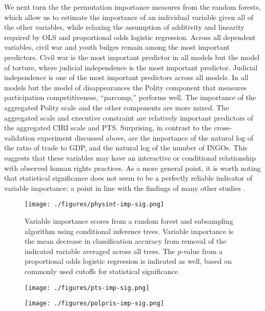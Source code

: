 \documentclass[12pt]{article}
\begin{document}
We next turn the the permutation importance measures from the random forests, which allow us to estimate the importance of an individual variable given all of the other variables, while relaxing the assumption of additivity and linearity required by OLS and proportional odds logistic regression. Across all dependent variables, civil war and youth bulges remain among the most important predictors. Civil war is the most important predictor in all models but the model of torture, where judicial independence is the most important predictor. Judicial independence is one of the most important predictors across all models. In all models but the model of disappearances the Polity component that measures participation competitiveness, ``parcomp,'' performs well. The importance of the aggregated Polity scale and the other components are more mixed. The aggregated scale and executive constraint are relatively important predictors of the aggregated CIRI scale and PTS. Surprising, in contrast to the cross-validation experiment discussed above, are the importance of the natural log of the ratio of trade to GDP, and the natural log of the number of INGOs. This suggests that these variables may have an interactive or conditional relationship with observed human rights practices. As a more general point, it is worth noting that statistical significance does not seem to be a perfectly reliable indicator of variable importance; a point in line with the findings of many other studies \citep{Wardetal2010}. %

\begin{figure}[!htpb]
\centering
\texttt{[image: ./figures/physint-imp-sig.png]}
\caption{Variable importance scores from a random forest and subsampling algorithm using conditional inference trees. Variable importance is the mean decrease in classification accuracy from removal of the indicated variable averaged across all trees. The $p$-value from a proportional odds logistic regression is indicated as well, based on commonly used cutoffs for statistical significance.}
\label{physint-imp}
\end{figure}

\begin{figure}[!htpb]
\centering
\texttt{[image: ./figures/pts-imp-sig.png]}
\caption{}
\label{pts-imp}
\end{figure}

\begin{figure}[!htpb]
\centering
\texttt{[image: ./figures/polpris-imp-sig.png]}
\caption{}
\label{polpris-imp}
\end{figure}
\end{document}
